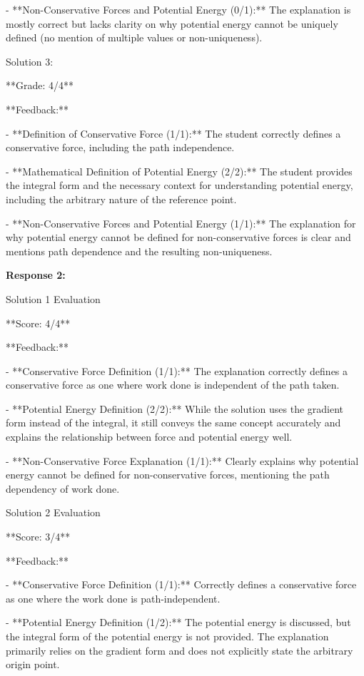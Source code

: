 \documentclass[a4paper,11pt]{article}
\begin{document}
- **Non-Conservative Forces and Potential Energy (0/1):** The explanation is mostly correct but lacks clarity on why potential energy cannot be uniquely defined (no mention of multiple values or non-uniqueness).

Solution 3:

**Grade: 4/4**

**Feedback:**

- **Definition of Conservative Force (1/1):** The student correctly defines a conservative force, including the path independence.

- **Mathematical Definition of Potential Energy (2/2):** The student provides the integral form and the necessary context for understanding potential energy, including the arbitrary nature of the reference point.

- **Non-Conservative Forces and Potential Energy (1/1):** The explanation for why potential energy cannot be defined for non-conservative forces is clear and mentions path dependence and the resulting non-uniqueness.

\bigskip
\textbf{Response 2:}

Solution 1 Evaluation

**Score: 4/4**

**Feedback:**

- **Conservative Force Definition (1/1):** The explanation correctly defines a conservative force as one where work done is independent of the path taken.

- **Potential Energy Definition (2/2):** While the solution uses the gradient form instead of the integral, it still conveys the same concept accurately and explains the relationship between force and potential energy well.

- **Non-Conservative Force Explanation (1/1):** Clearly explains why potential energy cannot be defined for non-conservative forces, mentioning the path dependency of work done.

Solution 2 Evaluation

**Score: 3/4**

**Feedback:**

- **Conservative Force Definition (1/1):** Correctly defines a conservative force as one where the work done is path-independent.

- **Potential Energy Definition (1/2):** The potential energy is discussed, but the integral form of the potential energy is not provided. The explanation primarily relies on the gradient form and does not explicitly state the arbitrary origin point.
\end{document}
